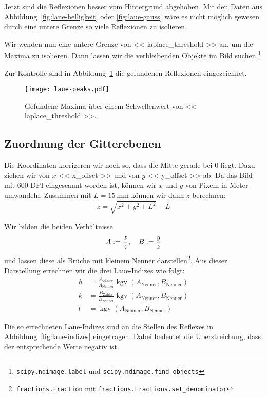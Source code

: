 Jetzt sind die Reflexionen besser vom Hintergrund abgehoben. Mit den Daten aus
Abbildung~\ref{fig:laue-helligkeit} oder \ref{fig:laue-gauss} wäre es nicht
möglich gewesen durch eine untere Grenze so viele Reflexionen zu isolieren.

Wir wenden nun eine untere Grenze von \num{<< laplace_threshold >>} an, um die
Maxima zu isolieren. Dann lassen wir die verbleibenden Objekte im Bild
suchen.\footnote{\texttt{scipy.ndimage.label} und
\texttt{scipy.ndimage.find\_objects}}

Zur Kontrolle sind in Abbildung~\ref{fig:laue-peaks} die gefundenen Reflexionen
eingezeichnet.

\begin{figure}[htbp]
    \centering
    \texttt{[image: laue-peaks.pdf]}
    \caption{%
        Gefundene Maxima über einem Schwellenwert von \num{<< laplace_threshold
        >>}.
    }
    \label{fig:laue-peaks}
\end{figure}

\subsection{Zuordnung der Gitterebenen}

Die Koordinaten korrigeren wir noch so, dass die Mitte gerade bei 0 liegt. Dazu
ziehen wir von $x$ \num{<< x_offset >>} und von $y$ \num{<< y_offset >>} ab. Da
das Bild mit 600 DPI eingescannt worden ist, können wir $x$ und $y$ von Pixeln
in Meter umwandeln. Zusammen mit $L = \SI{15}{\milli\meter}$ können wir dann
$z$ berechnen:
\[
    z = \sqrt{x^2 + y^2 + L^2} - L
\]

Wir bilden die beiden Verhältnisse
\[
    A := \frac xz
    ,\quad
    B := \frac yz
\]
und lassen diese als Brüche mit kleinem Nenner
darstellen\footnote{\texttt{fractions.Fraction} mit
\texttt{fractions.Fractions.set\_denominator}}. Aus dieser Darstellung
errechnen wir die drei Laue-Indizes wie folgt:
\begin{align*}
    h &= \frac{A_\text{Zähler}}{A_\text{Nenner}}
    \mathop{\mathrm{kgv}}(A_\text{Nenner}, B_\text{Nenner}) \\
    k &= \frac{B_\text{Zähler}}{B_\text{Nenner}}
    \mathop{\mathrm{kgv}}(A_\text{Nenner}, B_\text{Nenner}) \\
    l &= \mathop{\mathrm{kgv}}(A_\text{Nenner}, B_\text{Nenner})
\end{align*}

Die so errechneten Laue-Indizes sind an die Stellen des Reflexes in
Abbildung~\ref{fig:laue-indizes} eingetragen. Dabei bedeutet die
Überstreichung, dass der entsprechende Werte negativ ist.

